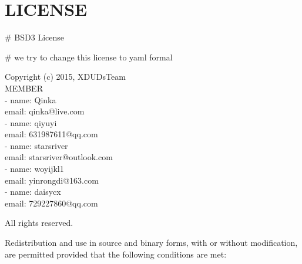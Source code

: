 






\makeatletter
\def\@NoStyleChapter{} %
\def\@BackendDoc{}
\def\@UsingAppendix{}
\makeatother



  \maketitle
  \newpage
  \section*{LICENSE}\label{license}
  \# BSD3 License
  
  \# we try to change this license to yaml formal
  
  \def\qqquad{\quad \qquad}
  Copyright (c) 2015, XDUDsTeam \\
  \hspace*{4em} MEMBER\\
  \hspace*{6em} - name: Qinka\\
  \hspace*{6.75em}email: qinka@live.com\\
  \hspace*{6em} - name: qiyuyi\\
  \hspace*{6.75em}email: 631987611@qq.com\\
  \hspace*{6em} - name: starsriver\\
  \hspace*{6.75em}email: starsriver@outlook.com\\
  \hspace*{6em} - name: woyijkl1\\
  \hspace*{6.75em}email: yinrongdi@163.com\\
  \hspace*{6em} - name: daisycx \\
  \hspace*{6.75em}email: 729227860@qq.com
  \vspace{0.5em}
  
  All rights reserved.
  \vspace*{0.5em}
  
  Redistribution and use in source and binary forms, with or without
  modification, are permitted provided that the following conditions are met:
  \vspace{.5em}
  
